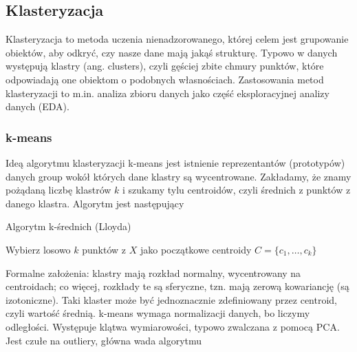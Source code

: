 \documentclass{myclass}
\begin{document}
\subsection{Klasteryzacja}

Klasteryzacja to metoda uczenia nienadzorowanego, której celem jest grupowanie obiektów, aby odkryć,
czy nasze dane mają jakąś strukturę. Typowo w danych występują klastry (ang. clusters), czyli
gęściej zbite chmury punktów, które odpowiadają one obiektom o podobnych własnościach. Zastosowania
metod klasteryzacji to m.in. analiza zbioru danych jako część eksploracyjnej analizy danych (EDA).

\subsubsection{k-means}

Ideą algorytmu klasteryzacji k-means jest istnienie reprezentantów (prototypów) danych group wokół
których dane klastry są wycentrowane. Zakładamy, że znamy pożądaną liczbę klastrów $k$ i szukamy
tylu centroidów, czyli średnich z punktów z danego klastra. Algorytm jest następujący

\begin{algorithm}[ht]
\caption{Algorytm k-średnich (Lloyda)}

Wybierz losowo $k$ punktów z $X$ jako początkowe centroidy $C = \{c_1, \ldots, c_k\}$\;

\end{algorithm}

Formalne założenia: klastry mają rozkład normalny, wycentrowany na centroidach; co więcej, rozkłady
te są sferyczne, tzn. mają zerową kowariancję (są izotoniczne). Taki klaster może być jednoznacznie
zdefiniowany przez centroid, czyli wartość średnią. k-means wymaga normalizacji danych, bo liczymy
odległości. Występuje klątwa wymiarowości, typowo zwalczana z pomocą PCA. Jest czułe na outliery,
główna wada algorytmu
\end{document}
